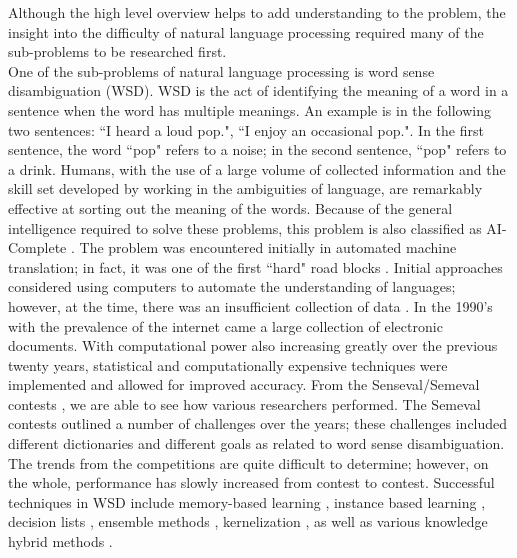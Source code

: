 Although the high level overview helps to add understanding to the problem, the insight into the difficulty of natural language processing required many of the sub-problems to be researched first.  
\\
One of the sub-problems of natural language processing is word sense disambiguation (WSD).  WSD is the act of identifying the meaning of a word in a sentence when the word has multiple meanings.  An example is in the following two sentences: ``I heard a loud pop.", ``I enjoy an occasional pop.".  In the first sentence, the word ``pop" refers to a noise; in the second sentence, ``pop" refers to a drink.  Humans, with the use of a large volume of collected information and the skill set developed by working in the ambiguities of language, are remarkably effective at sorting out the meaning of the words.  Because of the general intelligence required to solve these problems, this problem is also classified as AI-Complete \cite{BARHILL}.   The problem was encountered initially in automated machine translation; in fact, it was one of the first ``hard" road blocks \cite{WSDAS}.  Initial approaches considered using computers to automate the understanding of languages; however, at the time, there was an insufficient collection of data \cite{WSDAS}.  In the 1990's with the prevalence of the internet came a large collection of electronic documents.  With computational power also increasing greatly over the previous twenty years, statistical and computationally expensive techniques were implemented and allowed for improved accuracy.  From the Senseval/Semeval contests \cite{SEMEVAL}, we are able to see how various researchers performed.  The Semeval contests outlined a number of challenges over the years; these challenges included different dictionaries and different goals as related to word sense disambiguation.  The trends from the competitions are quite difficult to determine; however, on the whole, performance has slowly increased from contest to contest.  Successful techniques in WSD include memory-based learning \cite{GAMBL, PARAM_OPT, MEM-BASED}, instance based learning \cite{INSTANCE_LEARN}, decision lists \cite{YarrowskyDL}, ensemble methods \cite{ENSEMBLE}, kernelization \cite{KERNEL}, as well as various knowledge hybrid methods \cite{HAWKWSD}. 
\\
